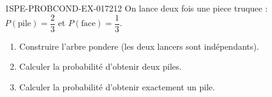 \begin{exercice}{1SPE-PROBCOND-EX-017}{2}{12}
On lance deux fois une piece truquee : $P(\text{pile}) = \dfrac{2}{3}$ et $P(\text{face}) = \dfrac{1}{3}$.

\begin{enumerate}
  \item Construire l'arbre pondere (les deux lancers sont indépendants).
  \item Calculer la probabilité d'obtenir deux piles.
  \item Calculer la probabilité d'obtenir exactement un pile.
\end{enumerate}
\end{exercice}
